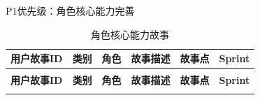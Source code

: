 \begin{levellist}
\begin{levellist}
        \item P1优先级：角色核心能力完善

        \begin{longtable}{>{\centering\arraybackslash}m{2.5cm} >{\centering\arraybackslash}m{1cm} >{\centering\arraybackslash}m{1cm} >{\centering\arraybackslash}m{5cm} >{\centering\arraybackslash}m{1.5cm} >{\centering\arraybackslash}m{1.5cm}}

            \caption{角色核心能力故事} \label{tab:training}                                                                                                                   \\

            \toprule
            \textbf{用户故事ID} & \textbf{类别} & \textbf{角色} & \textbf{故事描述}                                                              & \textbf{故事点} & \textbf{Sprint} \\
            \midrule
            \endfirsthead

            \multicolumn{6}{c}{{\tablename\ \thetable{} 续表}}                                                                                                          \\
            \toprule
            \textbf{用户故事ID} & \textbf{类别} & \textbf{角色} & \textbf{故事描述}                                                              & \textbf{故事点} & \textbf{Sprint} \\
            \midrule
            \endhead

            \bottomrule
            \endfoot


\end{longtable}
\end{levellist}
\end{levellist}
